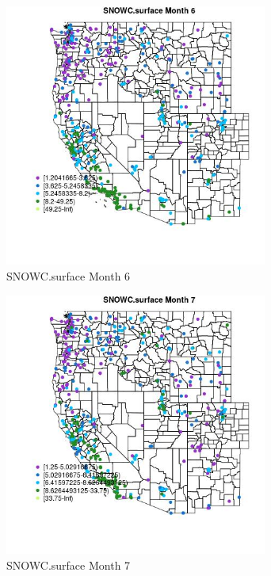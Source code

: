\begin{figure} 
\centering  
\includegraphics[width=0.77\textwidth]{Code_Outputs/ML_input_report_ML_input_PM25_Step5_part_d_de_duplicated_aves_ML_input_MapObsMo6SNOWCsurface.jpg} 
\caption{\label{fig:ML_input_report_ML_input_PM25_Step5_part_d_de_duplicated_aves_ML_inputMapObsMo6SNOWCsurface}SNOWC.surface Month 6} 
\end{figure} 
 

\begin{figure} 
\centering  
\includegraphics[width=0.77\textwidth]{Code_Outputs/ML_input_report_ML_input_PM25_Step5_part_d_de_duplicated_aves_ML_input_MapObsMo7SNOWCsurface.jpg} 
\caption{\label{fig:ML_input_report_ML_input_PM25_Step5_part_d_de_duplicated_aves_ML_inputMapObsMo7SNOWCsurface}SNOWC.surface Month 7} 
\end{figure} 
 

